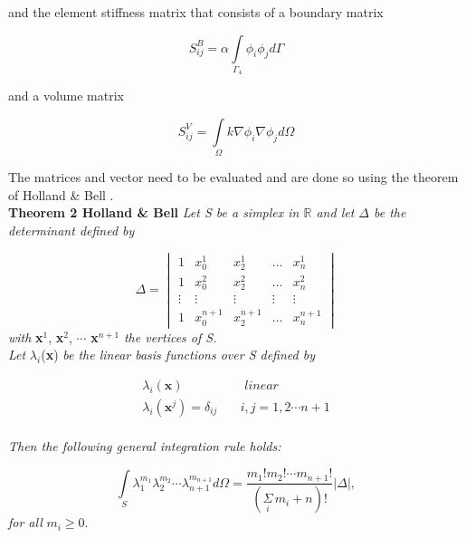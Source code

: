 \documentclass[10pt,a4paper]{article}
\begin{document}
and the element stiffness matrix that consists of a boundary matrix 

\begin{equation*}
S^{B}_{ij} = \alpha\underset{\Gamma_4}{\int}  \phi_i  \phi_jd\Gamma 
\end{equation*}

 and a volume matrix
 
\begin{equation*}
 S^V_{ij} = \underset{\Omega}{\int}k\nabla \phi_i  \nabla  \phi_j d\Omega
\end{equation*}
 
The matrices and vector need to be evaluated and are done so using the theorem of  Holland \& Bell .\\

\textbf{Theorem 2 Holland \& Bell} \textit{Let S be a simplex in $\mathbb{R}$ and let $\Delta$ be the determinant defined by }

\begin{equation*}\label{eq:det1}
\Delta = \begin{vmatrix}
1		& x^1_{0} 		& x^1_{2} 		& \dots 	& x^1_{n}\\
1		& x^2_{0} 		& x^2_{2} 		& \dots 	& x^2_{n}\\
\vdots	& \vdots		& \vdots 		& \vdots	& \vdots \\
1		& x^{n+1}_{0} 	& x^{n+1}_{2} 	& \dots 	& x^{n+1}_{n}
\end{vmatrix}
\end{equation*}
\textit{with} \textbf{x}$^1$, \textbf{x}$^2$, $\cdots$ \textbf{x}$^{n+1}$ \textit{the vertices of S.}\\

\textit{Let} $\lambda_i$(\textbf{x}) \textit{be the linear basis functions over S defined by}

\begin{equation*}
\begin{split}
\lambda_i(\textbf{x}) \quad& \textit{ linear}\\
\lambda_i(\textbf{x}^j)=\delta_{ij} \quad& i,j=1,2\cdots n+1
\end{split}
\end{equation*}
\\
\textit{Then the following general integration rule holds:}

\begin{equation*}
\underset{S}{\int}\lambda^{m_1}_1\lambda^{m_2}_2\cdots \lambda^{m_{n+1}}_{n+1}d\Omega = \frac{m_1! m_2! \cdots m_{n+1}!}{\left(\underset{i}{\Sigma} \, m_i +n \right)! }\lvert \Delta \rvert,
\end{equation*}
\textit{for all} $m_i\geq 0$.\\
\end{document}
